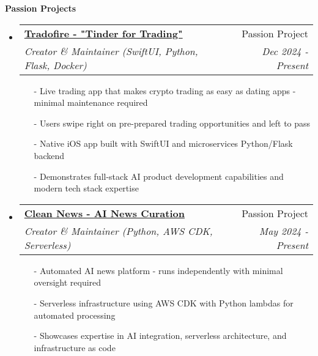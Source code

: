 \documentclass[letterpaper,11pt]{article}
\makeatletter
\newcommand{\resheading}[1]{{\large \colorbox{mygrey}{\begin{minipage}{\textwidth}{\textbf{#1 \vphantom{p\^{E}}}}\end{minipage}}}}
\newcommand{\ressubheading}[4]{
\begin{tabular*}{7.0in}{l@{\extracolsep{\fill}}r}
    \textbf{#1} & #2 \\
    \textit{#3} & \textit{#4} \\
\end{tabular*}\vspace{-6pt}}
\makeatother
\begin{document}
\resheading{Passion Projects}
\begin{itemize}
\item
    \ressubheading{\href{https://tradofire.com}{Tradofire - "Tinder for Trading"}}{Passion Project}{Creator \& Maintainer (SwiftUI, Python, Flask, Docker)}{Dec 2024 - Present}
    \begin{itemize}
        \item[-]{Live trading app that makes crypto trading as easy as dating apps - minimal maintenance required}
        \item[-]{Users swipe right on pre-prepared trading opportunities and left to pass}
        \item[-]{Native iOS app built with SwiftUI and microservices Python/Flask backend}
        \item[-]{Demonstrates full-stack AI product development capabilities and modern tech stack expertise}
    \end{itemize}

\item
    \ressubheading{\href{https://cleannews.fyi}{Clean News - AI News Curation}}{Passion Project}{Creator \& Maintainer (Python, AWS CDK, Serverless)}{May 2024 - Present}
    \begin{itemize}
        \item[-]{Automated AI news platform - runs independently with minimal oversight required}
        \item[-]{Serverless infrastructure using AWS CDK with Python lambdas for automated processing}
        \item[-]{Showcases expertise in AI integration, serverless architecture, and infrastructure as code}
    \end{itemize}
\end{itemize}

\vspace{0.2in}
\end{document}

